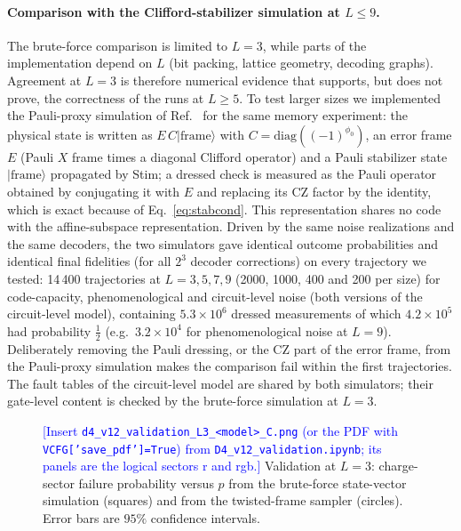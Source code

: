 \documentclass[a4paper]{article}
\newcommand{\blue}[1]{\textcolor{blue}{#1}}
\providecommand{\ket}[1]{\ensuremath{|#1\rangle}}
\begin{document}
\paragraph{Comparison with the Clifford-stabilizer simulation at $L\le9$.}
The brute-force comparison is limited to $L=3$, while parts of the implementation depend on $L$ (bit packing, lattice geometry, decoding graphs). Agreement at $L=3$ is therefore numerical evidence that supports, but does not prove, the correctness of the runs at $L\ge5$. To test larger sizes we implemented the Pauli-proxy simulation of Ref.~\cite{takada2026exact} for the same memory experiment: the physical state is written as $E\,C\ket{\mathrm{frame}}$ with $C=\mathrm{diag}((-1)^{\phi_0})$, an error frame $E$ (Pauli $X$ frame times a diagonal Clifford operator) and a Pauli stabilizer state $\ket{\mathrm{frame}}$ propagated by Stim; a dressed check is measured as the Pauli operator obtained by conjugating it with $E$ and replacing its CZ factor by the identity, which is exact because of Eq.~\eqref{eq:stabcond}. This representation shares no code with the affine-subspace representation. Driven by the same noise realizations and the same decoders, the two simulators gave identical outcome probabilities and identical final fidelities (for all $2^3$ decoder corrections) on every trajectory we tested: 14\,400 trajectories at $L=3,5,7,9$ (2000, 1000, 400 and 200 per size) for code-capacity, phenomenological and circuit-level noise (both versions of the circuit-level model), containing $5.3\times10^6$ dressed measurements of which $4.2\times10^5$ had probability $\tfrac12$ (e.g.\ $3.2\times10^4$ for phenomenological noise at $L=9$). Deliberately removing the Pauli dressing, or the CZ part of the error frame, from the Pauli-proxy simulation makes the comparison fail within the first trajectories. The fault tables of the circuit-level model are shared by both simulators; their gate-level content is checked by the brute-force simulation at $L=3$.

\begin{figure}[t]
  \centering
  \fbox{\rule{0pt}{50mm}\rule{0.82\linewidth}{0pt}}
  \caption{\blue{[Insert \texttt{d4\_v12\_validation\_L3\_<model>\_C.png} (or the PDF with \texttt{VCFG['save\_pdf']=True}) from \texttt{D4\_v12\_validation.ipynb}; its panels are the logical sectors r and rgb.]} Validation at $L=3$: charge-sector failure probability versus $p$ from the brute-force state-vector simulation (squares) and from the twisted-frame sampler (circles). Error bars are $95\%$ confidence intervals.}
  \label{fig:validation}
\end{figure}
\end{document}
